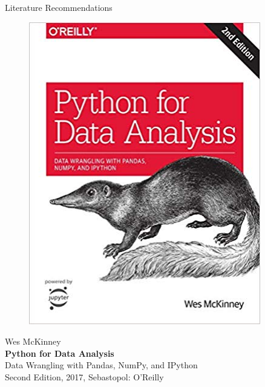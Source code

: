 \documentclass[document.tex]{subfiles}
\begin{document}
\begin{frame}{Literature Recommendations}
\begin{minipage}{0.1\textwidth}
\begin{figure}[H]
                \includegraphics[height=0.2\textheight, width=0.9\textwidth, left]{assets/book-covers/mckinney2017.jpg}
            \end{figure}
        \end{minipage}
        \begin{minipage}{0.39\textwidth}
            \footnotesize Wes McKinney \normalsize \\[-0.5mm]
            \small \textbf{Python for Data Analysis} \\[-0.8mm]
            Data Wrangling with Pandas, NumPy, and IPython \normalsize \\
            \tiny Second Edition, 2017, Sebastopol: O'Reilly \normalsize
        \end{minipage}
        

\end{frame}
\end{document}
